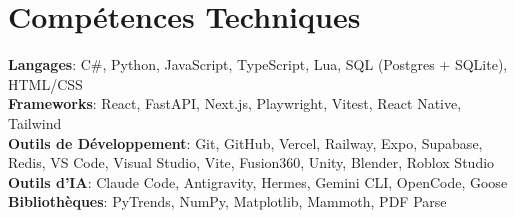 \section{Compétences Techniques}
  \begin{itemize}[leftmargin=0.15in, label={}]
    \small{\item{
      \textbf{Langages}{: C\#, Python, JavaScript, TypeScript, Lua, SQL (Postgres + SQLite), HTML/CSS} \\
      \textbf{Frameworks}{: React, FastAPI, Next.js, Playwright, Vitest, React Native, Tailwind} \\
      \textbf{Outils de Développement}{: Git, GitHub, Vercel, Railway, Expo, Supabase, Redis, VS Code, Visual Studio, Vite, Fusion360, Unity, Blender, Roblox Studio} \\
      \textbf{Outils d'IA}{: Claude Code, Antigravity, Hermes, Gemini CLI, OpenCode, Goose} \\
      \textbf{Bibliothèques}{: PyTrends, NumPy, Matplotlib, Mammoth, PDF Parse}
    }}
  \end{itemize}
